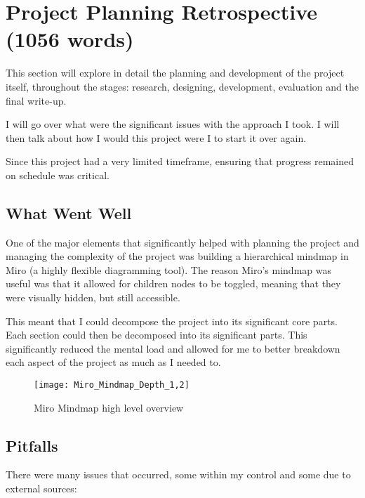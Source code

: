 \chapter{Project Planning Retrospective (1056 words)}
This section will explore in detail the planning and development of the project itself, throughout the stages: research, designing, development, evaluation and the final write-up.

I will go over what were the significant issues with the approach I took. I will then talk about how I would this project were I to start it over again.%

Since this project had a very limited timeframe, ensuring that progress remained on schedule was critical. %

\section{What Went Well}
One of the major elements that significantly helped with planning the project and managing the complexity of the project was building a hierarchical mindmap in Miro (a highly flexible diagramming tool). The reason Miro's mindmap was useful was that it allowed for children nodes to be toggled, meaning that they were visually hidden, but still accessible.

This meant that I could decompose the project into its significant core parts. Each section could then be decomposed into its significant parts. This significantly reduced the mental load and allowed for me to better breakdown each aspect of the project as much as I needed to.
\begin{figure}
    \texttt{[image: Miro\_Mindmap\_Depth\_1,2]}
    \caption{Miro Mindmap high level overview}
\end{figure}


\section{Pitfalls}
There were many issues that occurred, some within my control and some due to external sources:

